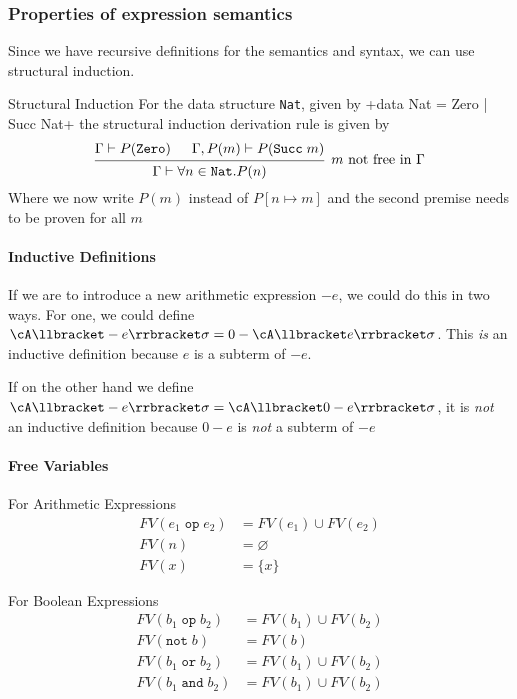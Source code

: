 \subsubsection{Properties of expression semantics}
Since we have recursive definitions for the semantics and syntax, we can use structural induction.

\begin{recall}[]{Structural Induction}
    For the data structure \texttt{Nat}, given by
    +data Nat = Zero | Succ Nat+
    the structural induction derivation rule is given by
    \[
        \begin{prooftree}
            \hypo{\Gamma \vdash P(\texttt{Zero})}
            \hypo{\Gamma, P(m) \vdash P(\texttt{Succ}\; m)}
            \infer2[$m$ not free in $\Gamma$]{\Gamma \vdash \forall n \in \texttt{Nat}. P(n)}
        \end{prooftree}
    \]
    Where we now write $P(m)$ instead of $P[n \mapsto m]$ and the second premise needs to be proven for all $m$
\end{recall}


\paragraph{Inductive Definitions}
If we are to introduce a new arithmetic expression $-e$, we could do this in two ways.
For one, we could define $\cA\llbracket -e \rrbracket \sigma = 0 - \cA\llbracket e \rrbracket \sigma$. This \textit{is} an inductive definition because $e$ is a subterm of $-e$.

If on the other hand we define $\cA\llbracket -e \rrbracket \sigma = \cA\llbracket 0 - e \rrbracket \sigma$,
it is \textit{not} an inductive definition because $0 - e$ is \textit{not} a subterm of $-e$


\paragraph{Free Variables}
For Arithmetic Expressions
\begin{align*}
    FV(e_1 \; \texttt{op} \; e_2) & = FV(e_1) \cup FV(e_2) \\
    FV(n)                         & = \varnothing          \\
    FV(x)                         & = \{ x \}
\end{align*}

For Boolean Expressions
\begin{align*}
    FV(b_1 \; \texttt{op} \; b_2)  & = FV(b_1) \cup FV(b_2) \\
    FV(\texttt{not}\; b)           & = FV(b)                \\
    FV(b_1 \; \texttt{or} \; b_2)  & = FV(b_1) \cup FV(b_2) \\
    FV(b_1 \; \texttt{and} \; b_2) & = FV(b_1) \cup FV(b_2)
\end{align*}

